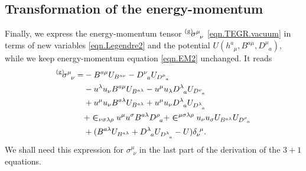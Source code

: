 \documentclass[
10pt, %
a4paper, %
oneside, %
headinclude,footinclude, %
BCOR5mm, %
]{scrartcl}
\newcommand{\tetrsymbol}{h}
\newcommand{\tetr}[2]{\tetrsymbol^{#1}_{\phantom{#1}#2}}
\newcommand{\Dm}[2]{D_{\phantom{#2}#1}^{#2}}	%
\newcommand{\Bm}[2]{B^{#1#2}}	%
\newcommand{\Um}{U}%
\newcommand{\EM}[2]{\Sigma^{#1}_{\phantom{#1}#2}}
\newcommand{\EMmat}[2]{\sigma^{#1}_{\ \,#2}}
\newcommand{\LCsymb}{\bm{\in}}    %
\newcommand{\gra}[1]{\prescript{\text{(g)}}{}{\hspace{-0.1cm}#1}}
\newcommand{\KD}[2]{\delta^{\ #1}_{#2}}
\begin{document}
\subsection{Transformation of the energy-momentum}
Finally, we express the energy-momentum tensor $ \gra{\EMmat{\mu}{\nu}} $ \eqref{eqn.TEGR.vacuum} 
in 
terms of 
new 
variables 
\eqref{eqn.Legendre2} and 
the potential $ \Um(\tetr{a}{\mu},\Bm{a}{\mu},\Dm{a}{\mu}) $, while we keep energy-momentum 
equation \eqref{eqn.EM2} unchanged. It reads
\begin{align}\label{eqn.sigma.BD}
	\gra{\EMmat{\mu}{\nu}} =
	& -\Bm{a}{\mu}\Um_{\Bm{a}{\nu}} - \Dm{a}{\nu}\Um_{\Dm{a}{\mu}} \\
	& - u^\lambda u_\nu \Bm{a}{\mu} \Um_{\Bm{a}{\lambda}} 
	  - u^\mu u_\lambda \Dm{a}{\lambda} \Um_{\Dm{a}{\nu}}
	  \nonumber\\
	& + u^\mu u_\nu \Bm{a}{\lambda} \Um_{\Bm{a}{\lambda}} 
	  + u^\mu u_\nu \Dm{a}{\lambda} \Um_{\Dm{a}{\lambda}}
	\nonumber \\
	& + \LCsymb_{\nu\sigma\lambda\rho} u^\mu u^\sigma \Bm{a}{\lambda} \Dm{a}{\rho} 
	  + \LCsymb^{\mu\sigma\lambda\rho} u_\nu u_\sigma \Um_{\Bm{a}{\lambda}} 
	\Um_{\Dm{a}{\rho}} 
	\nonumber \\
	& + (\Bm{a}{\lambda} \Um_{\Bm{a}{\lambda}} + \Dm{a}{\lambda} \Um_{\Dm{a}{\lambda}} - 
	\Um) \KD{\mu}{\nu}. \nonumber
\end{align}
We shall need this expression for $ \EMmat{\mu}{\nu} $ in the last part of the derivation of the $ 
3+1 $ equations.

\end{document}
